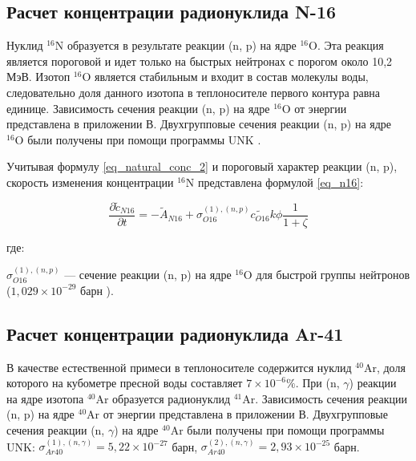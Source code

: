 \subsection{Расчет концентрации радионуклида N-16}

Нуклид $^{16}\text{N}$ образуется в результате реакции (n, p) на ядре $^{16}\text{O}$. Эта реакция является 
пороговой и идет только на быстрых нейтронах с порогом около 10,2 МэВ. Изотоп $^{16}\text{O}$ является стабильным и 
входит в состав молекулы воды, следовательно доля данного изотопа в теплоносителе первого контура равна единице. 
Зависимость сечения реакции (n, p) на ядре $^{16}\text{O}$ от энергии представлена в приложении В. Двухгрупповые 
сечения реакции (n, p) на ядре $^{16}\text{O}$ были получены при помощи программы UNK \cite{unk}.

Учитывая формулу \ref{eq_natural_conc_2} и пороговый характер реакции (n, p), скорость изменения концентрации 
$^{16}\text{N}$ представлена формулой \ref{eq_n16}:

\begin{equation}
    \label{eq_n16}
    \frac{\partial \widetilde{c}_{N16}}{\partial t} = -\widetilde{A}_{N16} + \sigma_{O16}^{(1), (n, p)} \widetilde{c_{O16}}
        k \phi \frac{1}{1 + \zeta}
\end{equation}

где:
\begin{description}
    \item $\sigma_{O16}^{(1), (n, p)}$ --- сечение реакции (n, p) на ядре $^{16}\text{O}$ для быстрой группы нейтронов 
        ($1,029 \times 10^{-29}$ барн \cite{unk}).
\end{description}

\subsection{Расчет концентрации радионуклида Ar-41}

В качестве естественной примеси в теплоносителе содержится нуклид $^{40}\text{Ar}$, доля которого на кубометре пресной 
воды составляет $7 \times 10^{-6} \%$. При (n, $\gamma$) реакции на ядре изотопа $^{40}\text{Ar}$ образуется радионуклид 
$^{41}\text{Ar}$. Зависимость сечения реакции (n, p) на ядре $^{40}\text{Ar}$ от энергии представлена в 
приложении В. Двухгрупповые сечения реакции (n, $\gamma$) на ядре $^{40}\text{Ar}$ были получены при помощи программы 
UNK: 
$\sigma_{Ar40}^{(1), (n, \gamma)} = 5,22 \times 10^{-27}$ барн, 
$\sigma_{Ar40}^{(2), (n, \gamma)} = 2,93 \times 10^{-25}$ барн.

